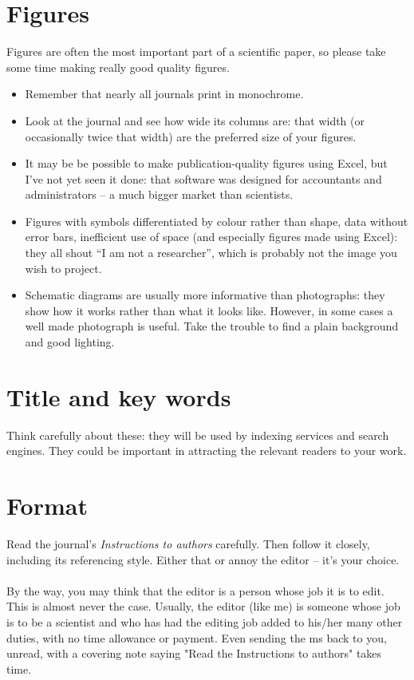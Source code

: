\documentclass[a4paper,12pt]{article}
\begin{document}
\section{Figures}
Figures are often the most important part of a scientific paper, so please take some time making really good quality figures.\\
\begin{itemize}
\item Remember that nearly all journals print in monochrome.
\item Look at the journal and see how wide its columns are: that width (or occasionally twice that width) are the preferred size of your figures.
\item It may be be possible to make publication-quality figures using Excel, but I've not yet seen it done: that software was designed for accountants and administrators – a much bigger market than scientists.
\item Figures with symbols differentiated by colour rather than shape, data without error bars, inefficient use of space (and especially figures made using Excel): they all shout “I am not a researcher”, which is probably not the image you wish to project.
\item Schematic diagrams are usually more informative than photographs: they show how it works rather than what it looks like. However, in some cases a well made photograph is useful. Take the trouble to find a plain background and good lighting. 
\end{itemize}
\section{Title and key words}
Think carefully about these: they will be used by indexing services and search engines. They could be important in attracting the relevant readers to your work.
\section{Format}
Read the journal’s \textit{Instructions to authors} carefully.  Then follow it closely, including its referencing style. Either that or annoy the editor – it’s your choice.\\\\By the way, you may think that the editor is a person whose job it is to edit. This is almost never the case. Usually, the editor (like me) is someone whose job is to be a scientist and who has had the editing job added to his/her many other duties, with no time allowance or payment. Even sending the ms back to you, unread, with a covering note saying "Read the Instructions to authors" takes time. 
\end{document}
